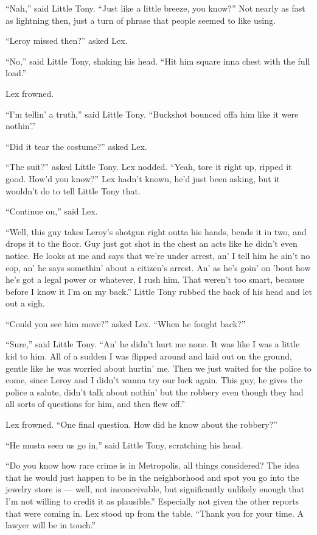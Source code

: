 ``Nah,'' said Little Tony. ``Just like a little breeze, you know?'' Not
nearly as fast as lightning then, just a turn of phrase that people
seemed to like using.

``Leroy missed then?'' asked Lex.

``No,'' said Little Tony, shaking his head. ``Hit him square inna chest
with the full load.''

Lex frowned.

``I'm tellin' a truth,'' said Little Tony. ``Buckshot bounced offa him
like it were nothin'.''

``Did it tear the costume?'' asked Lex.

``The suit?'' asked Little Tony. Lex nodded. ``Yeah, tore it right up,
ripped it good. How'd you know?'' Lex hadn't known, he'd just been
asking, but it wouldn't do to tell Little Tony that.

``Continue on,'' said Lex.

``Well, this guy takes Leroy's shotgun right outta his hands, bends it
in two, and drops it to the floor. Guy just got shot in the chest an
acts like he didn't even notice. He looks at me and says that we're
under arrest, an' I tell him he ain't no cop, an' he says somethin'
about a citizen's arrest. An' as he's goin' on 'bout how he's got a
legal power or whatever, I rush him. That weren't too smart, because
before I know it I'm on my back.'' Little Tony rubbed the back of his
head and let out a sigh.

``Could you see him move?'' asked Lex. ``When he fought back?''

``Sure,'' said Little Tony. ``An' he didn't hurt me none. It was like I
was a little kid to him. All of a sudden I was flipped around and laid
out on the ground, gentle like he was worried about hurtin' me. Then we
just waited for the police to come, since Leroy and I didn't wanna try
our luck again. This guy, he gives the police a salute, didn't talk
about nothin' but the robbery even though they had all sorts of
questions for him, and then flew off.''

Lex frowned. ``One final question. How did he know about the robbery?''

``He musta seen us go in,'' said Little Tony, scratching his head.

``Do you know how rare crime is in Metropolis, all things considered?
The idea that he would just happen to be in the neighborhood and spot
you go into the jewelry store is --- well, not inconceivable, but
significantly unlikely enough that I'm not willing to credit it as
plausible.'' Especially not given the other reports that were coming in.
Lex stood up from the table. ``Thank you for your time. A lawyer will be
in touch.''

